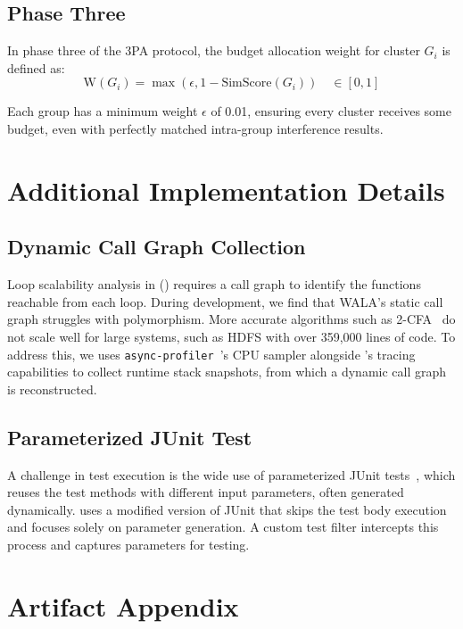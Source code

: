 \subsection{Phase Three}

In phase three of the 3PA protocol, 
the budget allocation weight for cluster $G_i$ is defined as: 
\begin{equation}
\mathrm{W}(G_i)=\max{(\epsilon, 1-\mathrm{SimScore}(G_i))} \quad \in [0,1]
\end{equation}

Each group has a minimum weight $\epsilon$ of 0.01, ensuring every cluster receives some budget, even with perfectly matched intra-group interference results.

\section{Additional Implementation Details}
\label{app:impl}

\subsection{Dynamic Call Graph Collection}

Loop scalability analysis in \tool () requires a call graph to identify the functions reachable from each loop.
During development, we find that WALA's static call graph struggles with polymorphism. More accurate algorithms such as 2-CFA~\cite{shivers1988control} do not scale well for large systems, such as HDFS with over 359,000 lines of code.
To address this, we uses \texttt{async-profiler}~\cite{async-prof}'s CPU sampler alongside \tool's tracing capabilities to collect runtime stack snapshots, from which a dynamic call graph is reconstructed.

\subsection{Parameterized JUnit Test} 

A challenge in test execution is the wide use of parameterized JUnit tests~\cite{junit-parameterized-test}, which reuses the test methods with different input parameters, often generated dynamically.
\tool uses a modified version of JUnit that skips the test body execution and focuses solely on parameter generation. A custom test filter intercepts this process and captures parameters for testing.

\section{Artifact Appendix} 

